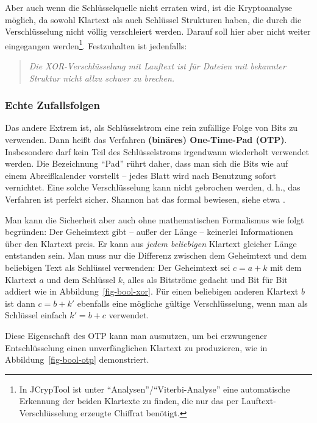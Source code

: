 \begin{refsegment}
Aber auch wenn die Schlüsselquelle nicht erraten wird, ist die Kryptoanalyse
möglich, da sowohl Klartext als auch Schlüssel Strukturen haben, die
durch die Verschlüsselung nicht völlig verschleiert werden. Darauf
soll hier aber nicht weiter eingegangen werden\footnote{%
   In JCrypTool ist unter "`Analysen"'/"`Viterbi-Analyse"' eine automatische
   Erkennung der beiden Klartexte zu finden, die nur das per
   Lauftext-Verschlüsselung erzeugte Chiffrat benötigt.
}. Festzuhalten ist jedenfalls:
\begin{quote}
   {\em Die XOR-Verschlüsselung mit Lauftext ist für
   Dateien mit bekannter Struktur nicht allzu schwer zu brechen.}
\end{quote}


\subsubsection*{Echte Zufallsfolgen}\label{s-bool-bitstr-real-random}

Das andere Extrem ist, als Schlüsselstrom eine
rein zufällige Folge von Bits zu verwenden. Dann heißt das Verfahren
\textbf{(binäres) One-Time-Pad (OTP)}.
Insbesondere darf kein Teil des Schlüsselstroms irgendwann wiederholt
verwendet werden. Die Bezeichnung "`Pad"' rührt daher, dass man sich
die Bits wie auf einem Abreißkalender vorstellt  -- jedes Blatt wird
nach Benutzung sofort vernichtet. Eine solche
Verschlüsselung kann nicht gebrochen werden, d.\,h., das Verfahren ist
perfekt sicher. Shannon hat das formal bewiesen,
siehe etwa \cite{Stin2006}.

Man kann die Sicherheit aber auch ohne mathematischen Formalismus wie
folgt begründen: Der Geheimtext gibt -- außer der Länge -- keinerlei
Informationen über den Klartext preis. Er kann aus {\em jedem beliebigen}
Klartext gleicher Länge entstanden sein. Man muss nur die Differenz
zwischen dem Geheimtext und dem beliebigen Text als Schlüssel verwenden:
Der Geheimtext sei $c = a + k$ mit dem Klartext $a$ und dem Schlüssel
$k$, alles als Bitströme gedacht und Bit für Bit addiert wie in
Abbildung~\ref{fig-bool-xor}. Für einen beliebigen anderen Klartext
$b$ ist dann $c = b + k'$ ebenfalls eine mögliche gültige Verschlüsselung,
wenn man als Schlüssel einfach $k' = b + c$ verwendet.

Diese Eigenschaft des OTP kann man ausnutzen, um bei erzwungener
Entschlüsselung einen unverfänglichen Klartext zu produzieren, wie
in Abbildung~\ref{fig-bool-otp} demonstriert.


\end{refsegment}

